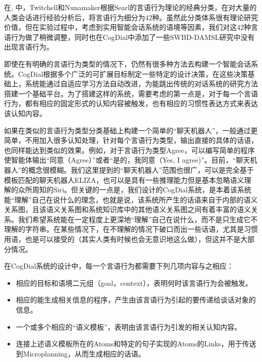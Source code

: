 在\cite{Twitchell2004}, 中，Twitchell和Nunamaker根据Searl的言语行为理论的经典分类，在对大量的人类会话进行经验分析后，将言语行为细分为42种。虽然此分类体系很有理论研究价值，但在实验过程中，考虑到实用智能会话系统的语境等因素，我们对这42种言语行为做了稍微调整，同时也在CogDial中添加了一些SWBD-DAMSL研究中没有出现言语行为。

即使在有明确的言语行为类型的情况下，仍然有很多种方法去构建一个智能会话系统。CogDial根据多个广泛的可扩展目标制定一些特定的设计决策，在这些决策基础上，系统能通过自适应学习方法自动改进，为能跳出传统的对话系统的研究方法搭建一个基础平台。为了搭建这样的系统，需要考虑的第一点是，对于每一个言语行为，都有相应的固定形式的认知内容被触发，也有相应的习惯性表达方式来表达该认知内容。

如果在类似的言语行为类型分类基础上构建一个简单的“聊天机器人”，一般通过更简单，不用加入很多认知处理，针对每个言语行为类型，输出直接的具体的话语，也同样能达到类似的效果。例如，对于言语行为类型Agree，可以编写简单的程序使智能体输出“同意（Agree）”或者“是的，我同意（Yes, I agree)”。目前，“聊天机器人”的概念很模糊。我们这里提到的“聊天机器人”范围也很广，可以是完全基于模板匹配的聊天机器人ELIZA\cite{Weizenbaum1966}，也可以是具有一些推理能力但是基本忽略语义理解的众所周知的Siri。但关键的一点是，我们设计的CogDial系统，是本着该系统能“理解”自己在说什么的理念，也就是说，该系统所产生的话语来自于内部的语义关系图，且该语义关系图和系统知识库中的其他语义关系图之间有着丰富的语义关系。我们希望系统能在一定程度上更深地“理解”自己在说什么，而不是只生成它不理解的字符串。在某些情况下，在不理解的情况下破口而出一些话语，尤其是习惯用语，也是可以接受的（其实人类有时候也会无意识地这么做），但这并不是大部分情况。

在CogDial系统的设计中，每一个言语行为都需要下列几项内容与之相应：
\begin{itemize}
\item 相应的目标和语境二元组（goal，context），表明何时该言语行为会被触发。
\item 相应的能生成相关信息的程序，产生由该言语行为引起的要传递给谈话对象的信息。
\item 一个或多个相应的“语义模板”，表明由该言语行为引发的相关认知内容。
\item 连接上述语义模板所在的Atoms和特定的句子实现的Atoms的Links，用于传送到Microplanning，从而生成相应的话语。
\end{itemize}

